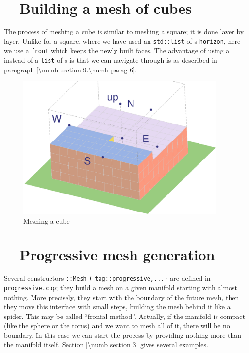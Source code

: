 \section{~~Building a mesh of cubes}\label{\numb section 12.\numb parag 5}

The process of meshing a cube is similar to meshing a square; it is done layer by layer.
Unlike for a square, where we have used an {\small\tt std::list} of {\small\tt{}}s
{\small\tt horizon}, here we use a {\small\tt{}} {\small\tt front} which
keeps the newly built faces.
The advantage of using a {\small\tt{}} instead of a {\small\tt list} of
{\small\tt{}}s is that we can navigate through is as described in paragraph
\ref{\numb section 9.\numb parag 6}.

\begin{figure}[ht] \centering
  \includegraphics[width=105mm]{build-cube.eps}
  \caption{Meshing a cube}
  \label{\numb section 12.\numb fig 3}
\end{figure}



\section{~~Progressive mesh generation}\label{\numb section 12.\numb parag 6}

Several constructors {\small\tt {}::Mesh} {\small\tt(}
{\small\tt\textcolor{tag}{tag}::progressive,...)} are defined in {\small\tt progressive.cpp};
they build a mesh on a given manifold starting with almost nothing.
More precisely, they start with the boundary of the future mesh, then they
move this interface with small steps, building the mesh behind it like a spider.
This may be called ``frontal method''.
Actually, if the manifold is compact (like the sphere or the torus) and we want to mesh
all of it, there will be no boundary.
In this case we can start the process by providing nothing more than the manifold itself.
Section \ref{\numb section 3} gives several examples.

